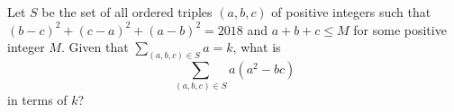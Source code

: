 Let $S$ be the set of all ordered triples $(a,b,c)$ of positive integers such that $(b-c)^2+(c-a)^2+(a-b)^2=2018$ and $a+b+c\leq M$ for some positive integer $M$. Given that $\displaystyle\sum_{(a,b,c)\in S}a=k$, what is
\[
	\sum_{(a,b,c)\in S}a(a^2-bc)
\]
in terms of $k$?